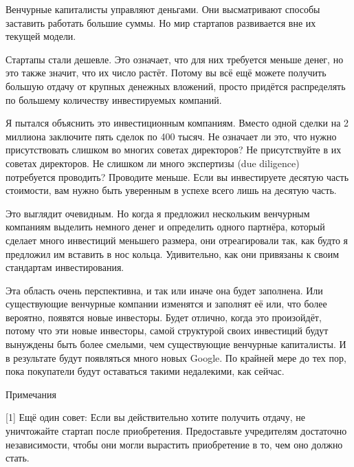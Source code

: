 \documentclass[ebook,12pt,oneside,openany]{memoir}
\begin{document}
Венчурные капиталисты управляют деньгами. Они высматривают способы
заставить работать большие суммы. Но мир стартапов развивается вне их
текущей модели.

Стартапы стали дешевле. Это означает, что для них требуется меньше
денег, но это также значит, что их число растёт. Потому вы всё ещё
можете получить большую отдачу от крупных денежных вложений, просто
придётся распределять по большему количеству инвестируемых компаний.

Я пытался объяснить это инвестиционным компаниям. Вместо одной сделки
на 2 миллиона заключите пять сделок по 400 тысяч. Не означает ли это,
что нужно присутствовать слишком во многих советах директоров? Не
присутствуйте в их советах директоров. Не слишком ли много экспертизы
(due diligence) потребуется проводить? Проводите меньше. Если вы
инвестируете десятую часть стоимости, вам нужно быть уверенным в
успехе всего лишь на десятую часть.

Это выглядит очевидным. Но когда я предложил нескольким венчурным
компаниям выделить немного денег и определить одного партнёра, который
сделает много инвестиций меньшего размера, они отреагировали так, как
будто я предложил им вставить в нос кольца. Удивительно, как они
привязаны к своим стандартам инвестирования.

Эта область очень перспективна, и так или иначе она будет заполнена.
Или существующие венчурные компании изменятся и заполнят её или, что
более вероятно, появятся новые инвесторы. Будет отлично, когда это
произойдёт, потому что эти новые инвесторы, самой структурой своих
инвестиций будут вынуждены быть более смелыми, чем существующие
венчурные капиталисты. И в результате будут появляться много новых
Google. По крайней мере до тех пор, пока покупатели будут оставаться
такими недалекими, как сейчас.

Примечания

[1] Ещё один совет: Если вы действительно хотите получить отдачу, не
уничтожайте стартап после приобретения. Предоставьте учредителям
достаточно независимости, чтобы они могли вырастить приобретение в то,
чем оно должно стать.
\end{document}
